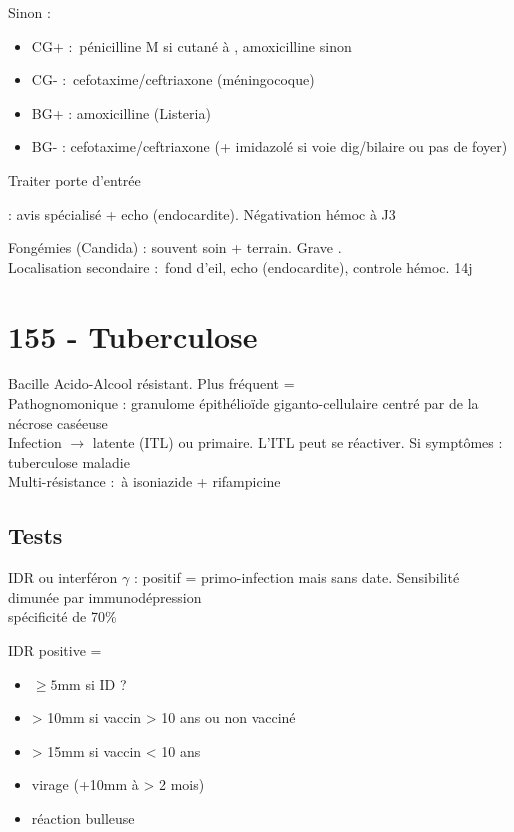 Sinon :
\begin{itemize}
  \item CG+ : pénicilline M si cutané à , amoxicilline sinon
  \item CG- : cefotaxime/ceftriaxone (méningocoque)
  \item BG+ : amoxicilline (Listeria)
  \item BG- : cefotaxime/ceftriaxone (+ imidazolé si voie dig/bilaire ou pas de
    foyer)
\end{itemize}

Traiter porte d'entrée \danger

\vspace*{1cm}
 :  avis spécialisé + echo (endocardite). Négativation hémoc à J3

Fongémies (Candida) : souvent soin + terrain. Grave .\\
Localisation secondaire : fond d'eil, echo (endocardite), controle hémoc. 14j

\section{155 - Tuberculose}%
\label{sec:tuberculose}

Bacille Acido-Alcool résistant. Plus fréquent = \\
Pathognomonique : granulome épithélioïde giganto-cellulaire centré par de la
nécrose caséeuse\\
Infection $\rightarrow$ latente (ITL) ou primaire. L'ITL peut se réactiver. Si
symptômes : tuberculose maladie\\
Multi-résistance : à isoniazide + rifampicine

\subsection{Tests}%
\label{sub:tests}
IDR ou interféron $\gamma$ : positif = primo-infection mais sans date.
Sensibilité dimunée par immunodépression\\
\danger spécificité de 70\%

IDR positive =
\begin{itemize}
  \item \diameter $\ge 5$mm si ID ? 
  \item \diameter > 10mm si vaccin > 10 ans ou non vacciné
  \item \diameter > 15mm si vaccin < 10 ans 
  \item virage (+10mm à > 2 mois)
  \item réaction bulleuse
\end{itemize}

